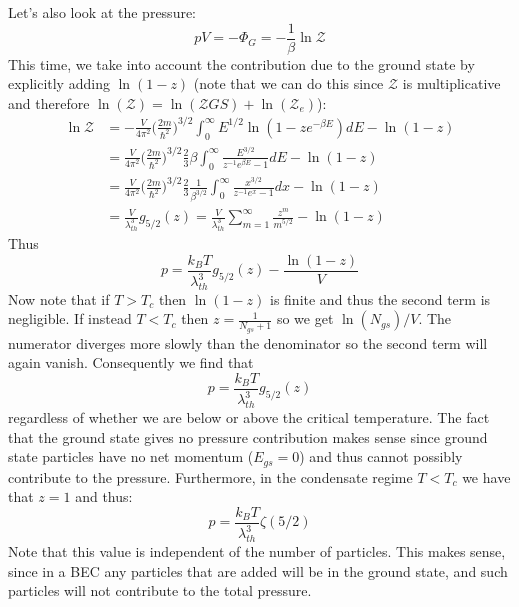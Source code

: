 \documentclass[a4paper,11pt,oneside]{book}
\begin{document}
Let's also look at the pressure:
\begin{equation}
    pV = -\Phi_G = -\frac{1}{\beta} \ln \mathcal{Z}
\end{equation}
This time, we take into account the contribution due to the ground state by explicitly adding $\ln(1-z)$ (note that we can do this since $\mathcal{Z}$ is multiplicative and therefore $\ln(\mathcal{Z}) = \ln (\mathcal{Z}{GS}) + \ln (\mathcal{Z}_{e})$):
\begin{align}
    \ln \mathcal{Z} &= -\frac{V}{4\pi^2}\bigg(\frac{2m}{\hbar^2}\bigg)^{3/2}\int_0^\infty E^{1/2} \ln(1-ze^{-\beta E})dE-\ln(1-z)\\
    &=\frac{V}{4\pi^2}\bigg(\frac{2m}{\hbar^2}\bigg)^{3/2}\frac{2}{3}\beta\int_0^\infty \frac{E^{3/2}}{z^{-1}e^{\beta E}-1} dE-\ln(1-z)\\
     &=\frac{V}{4\pi^2}\bigg(\frac{2m}{\hbar^2}\bigg)^{3/2}\frac{2}{3}\frac{1}{\beta^{3/2}}\int_0^\infty \frac{x^{3/2}}{z^{-1}e^{x}-1} dx-\ln(1-z)\\
    &= \frac{V}{\lambda_{th}^3} g_{5/2}(z)=\frac{V}{\lambda_{th}^3} \sum_{m=1}^\infty \frac{z^m}{m^{5/2}}-\ln(1-z)
\end{align}
Thus
\begin{equation}
    p = \frac{k_B T}{\lambda_{th}^3}g_{5/2}(z) - \frac{\ln(1-z)}{V}
\end{equation}
Now note that if $T>T_c$ then $\ln(1-z)$ is finite and thus the second term is negligible. If instead $T<T_c$ then $z = \frac{1}{N_{gs}+1}$ so we get $\ln(N_{gs})/V$. The numerator diverges more slowly than the denominator so the second term will again vanish. Consequently we find that
\begin{equation}
    p= \frac{k_B T}{\lambda_{th}^3}g_{5/2}(z) 
\end{equation}
regardless of whether we are below or above the critical temperature. The fact that the ground state gives no pressure contribution makes sense since ground state particles have no net momentum ($E_{gs}=0$) and thus cannot possibly contribute to the pressure. Furthermore, in the condensate regime $T<T_c$ we have that $z=1$ and thus:
\begin{equation}
    p=\frac{k_B T}{\lambda_{th}^3}\zeta(5/2)
\end{equation}
Note that this value is independent of the number of particles. This makes sense, since in a BEC any particles that are added will be in the ground state, and such particles will not contribute to the total pressure.
\end{document}
